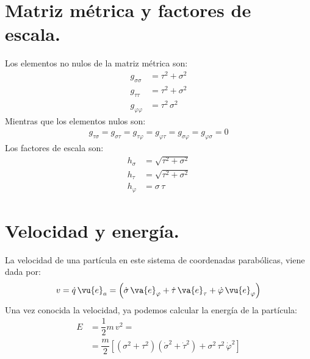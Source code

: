 \section{Matriz métrica y factores de escala.}
Los elementos no nulos de la matriz métrica son:
\begin{align*}
g_{\sigma \sigma} &= \tau^{2} + \sigma^{2} \\[0.5em]
g_{\tau \tau} &= \tau^{2} + \sigma^{2} \\[0.5em]
g_{\varphi \varphi} &= \tau^{2} \, \sigma^{2}
\end{align*}
Mientras que los elementos nulos son:
\begin{align*}
g_{\tau \sigma} = g_{\sigma \tau} = g_{\tau \varphi} = g_{\varphi \tau} = g_{\sigma \varphi} = g_{\varphi \sigma} = 0
\end{align*}
Los factores de escala son:
\begin{align*}
h_{\sigma} &= \sqrt{\tau^{2} + \sigma^{2}} \\[0.5em]
h_{\tau} &= \sqrt{\tau^{2} + \sigma^{2}} \\[0.5em]
h_{\varphi} &= \sigma \, \tau
\end{align*}
\section{Velocidad y energía.}
La velocidad de una partícula en este sistema de coordenadas parabólicas, viene dada por:
\begin{align*}
v = \dot{q} \, \vu{e}_{a} = \left( \dot{\sigma} \, \va{e}_{\varphi} + \dot{\tau} \, \va{e}_{\tau} + \dot{\varphi} \, \vu{e}_{\varphi} \right)
\end{align*}
Una vez conocida la velocidad, ya podemos calcular la energía de la partícula:
\begin{align*}
E &= \dfrac{1}{2} m \, v^{2} = \\[0.5em]
&= \dfrac{m}{2} \left[ (\sigma^{2} + \tau^{2}) (\dot{\sigma}^{2} + \dot{\tau}^{2}) + \sigma^{2} \, \tau^{2} \, \dot{\varphi}^{2} \right]
\end{align*}
